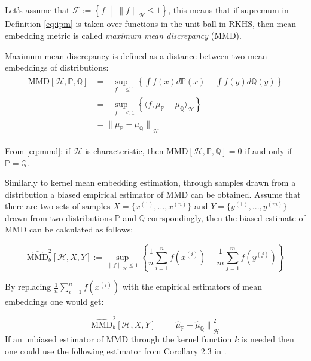 Let's assume that $\mathcal{F} := \left\{f \;\middle| \;{\lVert f \rVert}_{\mathscr{H}} \leq 1\right\}$, this means that if supremum in Definition \ref{eq:ipm} is taken over functions in the unit ball in RKHS, then mean embedding metric is called \textit{maximum mean discrepancy} (MMD). 

\begin{definition}[IPM]
    Maximum mean discrepancy is defined as a distance between two mean embeddings of distributions:
    \begin{align}
        \begin{split}
            \textrm{MMD} [\mathscr{H}, \mathds{P}, \mathds{Q}] & = \sup_{ \lVert f \rVert \leq 1} \left\{ \int f(x) d\mathds{P}(x) -  \int f(y) d\mathds{Q}(y) \right\} \\ 
            & = \sup_{ \lVert f \rVert \leq 1} \left\{ \langle f, \mu_{\mathds{P}} - \mu_{\mathds{Q}} \rangle_{\mathscr{H}} \right\} \\
            & = {\lVert \mu_{\mathds{P}} - \mu_{\mathds{Q}} \rVert }_{\mathscr{H}}\label{eq:mmd}
        \end{split}
    \end{align}
\end{definition}

From \ref{eq:mmd}: if $\mathscr{H}$ is characteristic, then $\textrm{MMD}[\mathscr{H}, \mathds{P}, \mathds{Q}] = 0$ if and only if $\mathds{P} = \mathds{Q}$.

Similarly to kernel mean embedding estimation,  through samples drawn from a distribution a biased empirical estimator of MMD can be obtained. Assume that there are two sets of samples $X=\{x^{(1)}, ..., x^{(n)}\}$ and $Y=\{y^{(1)}, ..., y^{(m)}\}$ drawn from two distributions $\mathds{P}$ and $\mathds{Q}$ corrspondingly, then the biased estimate of MMD can be calculated as follows:

\begin{equation}
    \widehat{\textrm{MMD}}_b^2 [\mathscr{H}, X, Y] := \sup_{ {\lVert f \rVert}_{\mathscr{H}} \leq 1} \left\{ \frac{1}{n} \sum^n_{i=1}{f(x^{(i)})} - \frac{1}{m} \sum^m_{j=1}{f(y^{(j)})} \right\} 
\end{equation}

By replacing $\frac{1}{n}\sum^n_{i=1}{f(x^{(i)})}$ with the empirical estimators of mean embeddings one would get:

\begin{equation}
    \widehat{\textrm{MMD}}_b^2 [\mathscr{H}, X, Y] = {\lVert \widehat{\mu}_{\mathds{P}} - \widehat{\mu}_{\mathds{Q}} \rVert }_{\mathscr{H}}^2
\end{equation}
If an unbiased estimator of MMD through the kernel function $k$ is needed then one could use the following estimator from Corollary 2.3 in \cite{Borgwardt_2006}.

